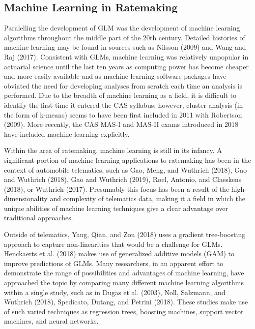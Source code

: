 \documentclass[preprint, 3p, twocolumn, letterpaper, 10pt]{elsarticle} %
\begin{document}
\hypertarget{machine-learning-in-ratemaking}{%
\subsection{Machine Learning in Ratemaking}\label{machine-learning-in-ratemaking}}

Paralelling the development of GLM was the development of machine learning
algorithms throughout the middle part of the 20th century. Detailed histories
of machine learning may be found in sources such as Nilsson (2009) and
Wang and Raj (2017). Consistent with GLMs, machine learning was relatively unpopular
in actuarial science until the last ten years as computing power has become cheaper
and more easily available and as machine learning software packages have obviated
the need for developing analyses from scratch each time an analysis is performed.
Due to the breadth of machine learning as a field, it is difficult to identify
the first time it entered the CAS syllabus; however, cluster analysis (in the
form of k-means) seems to have been first included in 2011 with Robertson (2009).
More recently, the CAS MAS-I and MAS-II exams introduced in 2018 have included
machine learning explicitly.

Within the area of ratemaking, machine learning is still in its infancy. A
significant portion of machine learning applications to ratemaking has been in
the context of automobile telematics, such as Gao, Meng, and Wuthrich (2018), Gao and Wuthrich (2018), Gao and Wuthrich (2019),
Roel, Antonio, and Claeskens (2018), or Wuthrich (2017). Presumably this focus has been a result of the
high-dimensionality and complexity of telematics data, making it a field in
which the unique abilities of machine learning techniques give a clear
advantage over traditional approaches.

Outside of telematics, Yang, Qian, and Zou (2018) uses a gradient tree-boosting approach to
capture non-linearities that would be a challenge for GLMs. Henckaerts et al. (2018)
makes use of generalized additive models (GAM) to improve predictions of GLMs.
Many researchers, in an apparent effort to demonstrate the range of possibilities
and advantages of machine learning, have approached the topic by comparing many
different machine learning algorithms within a single study, such as in
Dugas et al. (2003), Noll, Salzmann, and Wuthrich (2018), Spedicato, Dutang, and Petrini (2018). These studies make use of such varied
techniques as regression trees, boosting machines, support vector machines, and
neural networks.
\end{document}
